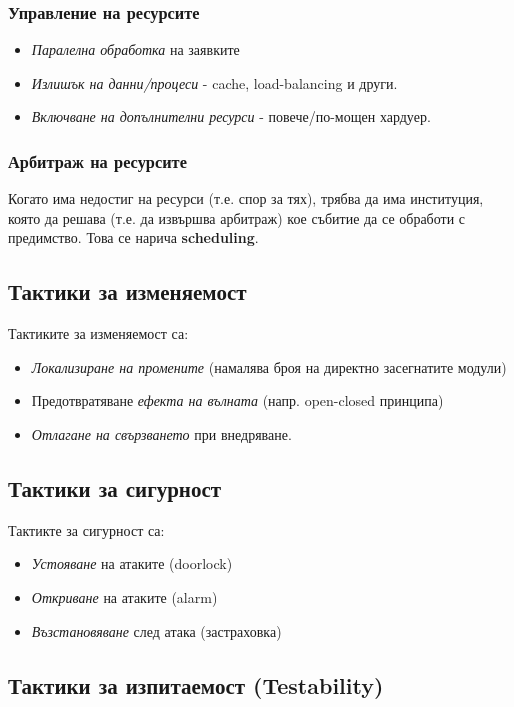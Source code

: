 \documentclass[fleqn,12pt]{article}
\begin{document}
\subsubsection{Управление на ресурсите}
\begin{itemize}
\item \textit{Паралелна обработка} на заявките
\item \textit{Излишък на данни/процеси} - cache, load-balancing и други.
\item \textit{Включване на допълнителни ресурси} - повече/по-мощен хардуер.
\end{itemize}

\subsubsection{Арбитраж на ресурсите}
Когато има недостиг на ресурси (т.е. спор за тях), трябва да има институция, която да решава (т.е. да извършва арбитраж) кое събитие да се обработи с предимство. Това се нарича \textbf{scheduling}. 

\subsection{Тактики за изменяемост}

Тактиките за изменяемост са:
\begin{itemize}
    \item \textit{Локализиране на промените} (намалява броя на директно засегнатите модули)
    \item Предотвратяване \textit{ефекта на вълната} (напр. open-closed принципа)
    \item \textit{Отлагане на свързването} при внедряване.
\end{itemize}

\subsection{Тактики за сигурност}

Тактикте за сигурност са:
\begin{itemize}
    \item \textit{Устояване} на атаките (doorlock)
    \item \textit{Откриване} на атаките (alarm)
    \item \textit{Възстановяване} след атака (застраховка)
\end{itemize}

\subsection{Тактики за изпитаемост (Testability)}
\end{document}
